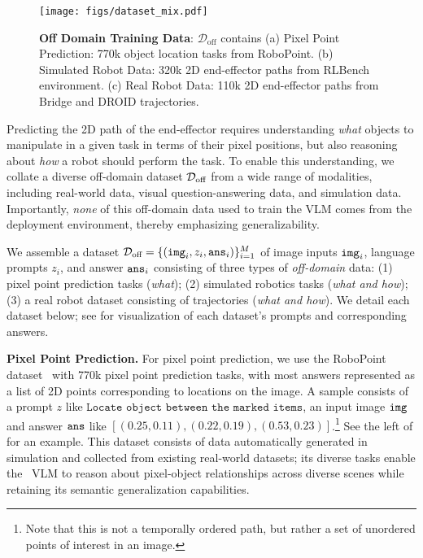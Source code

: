 \begin{figure}[t]
    \centering
    \texttt{[image: figs/dataset\_mix.pdf]}
\caption{\footnotesize\textbf{Off Domain Training Data}: $\mathcal{D}_\text{off}$ contains (a) Pixel Point Prediction: 770k object location tasks from RoboPoint. (b) Simulated Robot Data: 320k 2D end-effector paths from RLBench environment. (c) Real Robot Data: 110k 2D end-effector paths from Bridge and DROID trajectories.}

    \label{fig:experiments:training_data}
\end{figure}
Predicting the 2D path of the end-effector requires understanding \emph{what} objects to manipulate in a given task in terms of their pixel positions, but also reasoning about \emph{how} a robot should perform the task. To enable this understanding, we collate a diverse off-domain dataset $\mathcal{D}_\text{off}$ from a wide range of modalities, including real-world data, visual question-answering data, and simulation data. Importantly, \emph{none} of this off-domain data used to train the VLM comes from the deployment environment, thereby emphasizing generalizability. 

We assemble a dataset ${\mathcal{D}}_\text{off} = \{({\tt img}_i, z_i, {\tt ans}_i)\}_{i=1}^M$ of image inputs ${\tt img}_i$, language prompts $z_i$, and answer ${\tt ans}_i$ consisting of three types of \emph{off-domain} data: (1) pixel point prediction tasks (\emph{what}); (2) simulated robotics tasks (\emph{what and how}); (3) a real robot dataset consisting of trajectories (\emph{what and how}). 
We detail each dataset below; see  for visualization of each dataset's prompts and corresponding answers. 

\textbf{Pixel Point Prediction.} For pixel point prediction, we use the RoboPoint dataset~\citep{yuan2024robopoint} with 770k pixel point prediction tasks, with most answers represented as a list of 2D points corresponding to locations on the image. A sample consists of a prompt $z$ like $\texttt{Locate object between the marked items}$, an input image $\tt img$ and answer $\tt ans$ like \texttt{$[(0.25, 0.11), (0.22, 0.19), (0.53, 0.23)]$}.\footnote{Note that this is not a temporally ordered path, but rather a set of unordered points of interest in an image.} See the left of  for an example. This dataset consists of data automatically generated in simulation and collected from existing real-world datasets; its diverse tasks 
enable the \method\ VLM to reason about pixel-object relationships across diverse scenes while retaining its semantic generalization capabilities.


